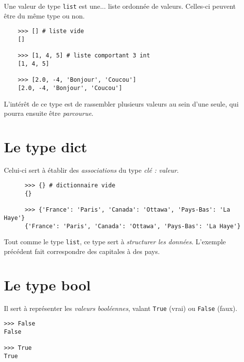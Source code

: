 Une valeur de type \texttt{list} est une... liste ordonnée de valeurs. Celles-ci peuvent être du même type ou non.

\begin{pyc}
  \begin{verbatim}
    >>> [] # liste vide
    []

    >>> [1, 4, 5] # liste comportant 3 int
    [1, 4, 5]

    >>> [2.0, -4, 'Bonjour', 'Coucou']
    [2.0, -4, 'Bonjour', 'Coucou']
  \end{verbatim}
\end{pyc}

L'intérêt de ce type est de rassembler plusieurs valeurs au sein d'une seule, qui pourra ensuite être \textit{parcourue}.

\section{Le type dict}

Celui-ci sert à établir des \textit{associations} du type \textit{clé : valeur}.

\begin{pyc}
  \begin{verbatim}
      >>> {} # dictionnaire vide
      {}

      >>> {'France': 'Paris', 'Canada': 'Ottawa', 'Pays-Bas': 'La Haye'}
      {'France': 'Paris', 'Canada': 'Ottawa', 'Pays-Bas': 'La Haye'}
    \end{verbatim}
\end{pyc}

Tout comme le type \texttt{list}, ce type sert à \textit{structurer les données}. L'exemple précédent fait correspondre des capitales à des pays.



\section{Le type bool}
Il sert à représenter les \textit{valeurs booléennes}, valant \texttt{True} (vrai) ou
\texttt{False} (faux).

\begin{pyc}\begin{verbatim}
>>> False
False

>>> True
True
\end{verbatim}
\end{pyc}

